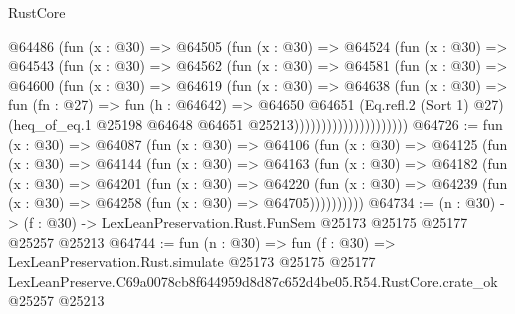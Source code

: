 \begin{lexlean}{RustCore}
\begin{coremodule}
                        @64486
                          (fun (x : @30) =>
                          @64505
                            (fun (x : @30) =>
                            @64524
                              (fun (x : @30) =>
                              @64543
                                (fun (x : @30) =>
                                @64562
                                  (fun (x : @30) =>
                                  @64581
                                    (fun (x : @30) =>
                                    @64600
                                      (fun (x : @30) =>
                                      @64619
                                        (fun (x : @30) =>
                                        @64638
                                          (fun (x : @30) =>
                                          fun (fn : @27) =>
                                          fun (h : @64642) =>
                                          @64650
                                            @64651
                                            (Eq.refl.{2} (Sort 1) @27)
                                            (heq_of_eq.{1}
                                              @25198
                                              @64648
                                              @64651
                                              @25213)))))))))))))))))))))
@64726 := fun (x : @30) =>
  @64087
    (fun (x : @30) =>
    @64106
      (fun (x : @30) =>
      @64125
        (fun (x : @30) =>
        @64144
          (fun (x : @30) =>
          @64163
            (fun (x : @30) =>
            @64182
              (fun (x : @30) =>
              @64201
                (fun (x : @30) =>
                @64220
                  (fun (x : @30) =>
                  @64239 (fun (x : @30) => @64258 (fun (x : @30) => @64705))))))))))
@64734 := (n : @30) ->
  (f : @30) -> LexLeanPreservation.Rust.FunSem @25173 @25175 @25177 @25257 @25213
@64744 := fun (n : @30) =>
  fun (f : @30) =>
  LexLeanPreservation.Rust.simulate
    @25173
    @25175
    @25177
    LexLeanPreserve.C69a0078cb8f644959d8d87c652d4be05.R54.RustCore.crate_ok
    @25257
    @25213
\end{coremodule}
\end{lexlean}
